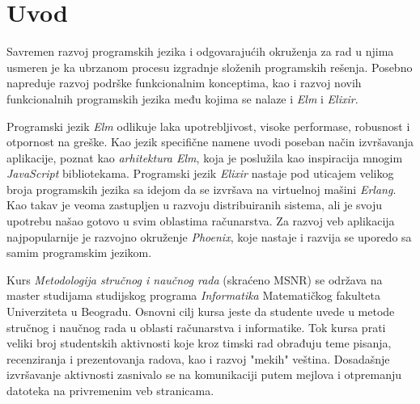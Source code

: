 \documentclass[12pt,oneside]{memoir}
\begin{document}
\frontmatter
\naslovna
\komisija
\apstrakt
\tableofcontents*

\mainmatter

\chapter{Uvod}
Savremen razvoj programskih jezika i odgovarajućih okruženja za rad u njima
usmeren je ka ubrzanom procesu izgradnje složenih programskih rešenja. Posebno
napreduje razvoj podrške funkcionalnim konceptima, kao i razvoj novih funkcionalnih
programskih jezika među kojima se nalaze i \emph{Elm} i \emph{Elixir}. 

Programski jezik \emph{Elm} odlikuje laka upotrebljivost, visoke performase,
robusnost i otpornost na greške. Kao jezik specifične namene uvodi poseban
način izvršavanja aplikacije, poznat kao \emph{arhitektura Elm}, koja je
poslužila kao inspiracija mnogim \emph{JavaScript} bibliotekama.
Programski jezik \emph{Elixir} nastaje pod
uticajem velikog broja programskih jezika sa idejom da se izvršava na virtuelnoj
mašini \emph{Erlang}. Kao takav je veoma zastupljen u razvoju distribuiranih sistema,
ali je svoju upotrebu našao gotovo u svim oblastima računarstva.
Za razvoj veb aplikacija najpopularnije je razvojno okruženje \emph{Phoenix}, koje
nastaje i razvija se uporedo sa samim programskim jezikom.

Kurs \emph{Metodologija stručnog i naučnog rada} (skraćeno MSNR) se održava na master studijama
studijskog programa \emph{Informatika} Matematičkog fakulteta Univerziteta u Beogradu.
Osnovni cilj kursa jeste da studente uvede u metode stručnog i naučnog rada u oblasti računarstva
i informatike. Tok kursa prati veliki broj studentskih aktivnosti koje kroz timski rad
obrađuju teme pisanja, recenziranja i prezentovanja radova, kao i razvoj "mekih" veština.
Dosadašnje izvršavanje aktivnosti zasnivalo se na komunikaciji putem mejlova i otpremanju datoteka na
privremenim veb stranicama.
\end{document}
